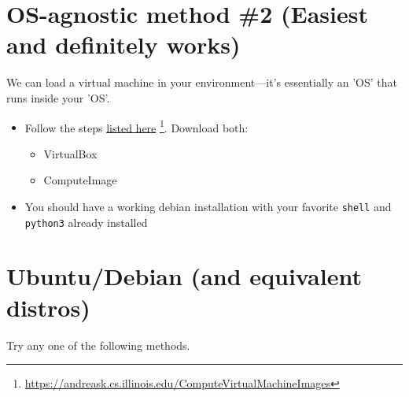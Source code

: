 \documentclass[11pt]{article}
\begin{document}
\section*{OS-agnostic method \#2 (Easiest and definitely works)}
\label{sec:org8c27a09}
We can load a virtual machine in your environment---it's essentially an 'OS' that
runs inside your 'OS'.
\begin{itemize}
\item Follow the steps \href{https://andreask.cs.illinois.edu/ComputeVirtualMachineImages}{listed here} \footnote{\url{https://andreask.cs.illinois.edu/ComputeVirtualMachineImages}}. Download both:
\label{sec:org44c0792}
\begin{itemize}
\item VirtualBox
\label{sec:org3e0d38c}
\item ComputeImage
\label{sec:org14a894d}
\end{itemize}
\item You should have a working debian installation with your favorite
\label{sec:orgda63405}
\texttt{shell} and \texttt{python3} already installed
\end{itemize}

\section*{Ubuntu/Debian (and equivalent distros)}
\label{sec:orgdecab9f}
Try any one of the following methods.
\end{document}

